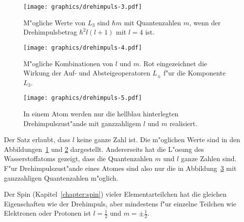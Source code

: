 \begin{figure}
\centering
\texttt{[image: graphics/drehimpuls-3.pdf]}
\caption{M"ogliche Werte von $L_3$ sind $\hbar m$ mit Quantenzahlen $m$, wenn
der Drehimpulsbetrag $\hbar^2 l(l+1)$ mit $l=4$ ist.
\label{skript:drehimpulsrange}}
\end{figure}%
\begin{figure}
\centering
\texttt{[image: graphics/drehimpuls-4.pdf]}
\caption{M"ogliche Kombinationen von $l$ und $m$. Rot eingezeichnet
die Wirkung der Auf- und Absteigeoperatoren $L_\pm$ f"ur die Komponente $L_3$.
\label{skript:drehimpulsspektrum}}
\end{figure}
\begin{figure}
\centering
\texttt{[image: graphics/drehimpuls-5.pdf]}
\caption{In einem Atom werden nur die hellblau hinterlegten Drehimpulszust"ande
mit ganzzahligem $l$ und $m$ realisiert.
\label{skript:realisiertedrehimpulszustaende}}
\end{figure}

Der Satz erlaubt, dass $l$ keine ganze Zahl ist.
Die m"oglichen Werte sind in den Abbildungen~\ref{skript:drehimpulsrange}
und \ref{skript:drehimpulsspektrum} dargestellt.
Andererseits hat die L"osung des Wasserstoffatoms gezeigt, dass die
Quantenzahlen $m$ und $l$ ganze Zahlen sind.
F"ur Drehimpulszust"ande eines Atomes sind also nur
die in Abbildung~\ref{skript:realisiertedrehimpulszustaende}
mit ganzzahligen Quantenzahlen m"oglich.

Der Spin (Kapitel~\ref{chapter:spin}) vieler Elementarteilchen
hat die gleichen Eigenschaften wie der Drehimpuls, aber mindestens
f"ur einzelne Teilchen wie Elektronen oder Protonen ist $l=\frac12$
und $m=\pm\frac12$.

